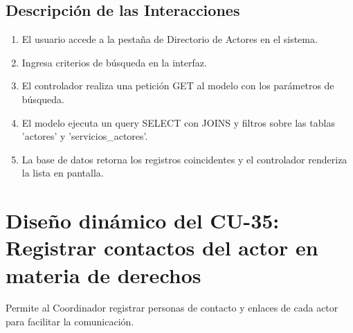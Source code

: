 \subsection{Descripción de las Interacciones}
\begin{enumerate}
    \item El usuario accede a la pestaña de Directorio de Actores en el sistema.
    \item Ingresa criterios de búsqueda en la interfaz.
    \item El controlador realiza una petición GET al modelo con los parámetros de búsqueda.
    \item El modelo ejecuta un query SELECT con JOINS y filtros sobre las tablas 'actores' y 'servicios\_actores'.
    \item La base de datos retorna los registros coincidentes y el controlador renderiza la lista en pantalla.
\end{enumerate}

\cleardoublepage
\section{Diseño dinámico del CU-35: Registrar contactos del actor en materia de derechos}
\label{sec:disenoDinamicoCU35}

Permite al Coordinador registrar personas de contacto y enlaces de cada actor para facilitar la comunicación.

